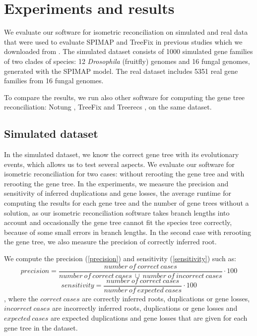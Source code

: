 \chapter{Experiments and results}

We evaluate our software for isometric reconciliation on simulated and real data that were used to evaluate SPIMAP \cite{spimap} and TreeFix \cite{treefix} in previous studies which we downloaded from \cite{treefix_online}. The simulated dataset consists of 1000 simulated gene families of two clades of species: 12 \emph{Drosophila} (fruitfly) genomes and 16 fungal genomes, generated with the SPIMAP model. The real dataset includes 5351 real gene families from 16 fungal genomes.

To compare the results, we run also other software for computing the gene tree reconciliation: Notung \cite{notung}, TreeFix \cite{treefix} and Treerecs \cite{treerecs}, on the same dataset.

\section{Simulated dataset}

In the simulated dataset, we know the correct gene tree with its evolutionary events, which allows us to test several aspects. We evaluate our software for isometric reconciliation for two cases: without rerooting the gene tree and with rerooting the gene tree. In the experiments, we measure the precision and sensitivity of inferred duplications and gene losses, the average runtime for computing the results for each gene tree and the number of gene trees without a solution, as our isometric reconciliation software takes branch lengths into account and occasionally the gene tree cannot fit the species tree correctly, because of some small errors in branch lengths. In the second case with rerooting the gene tree, we also measure the precision of correctly inferred root.

We compute the precision (\ref{precision}) and sensitivity (\ref{sensitivity}) such as:
\begin{equation}
\label{precision}
    precision = \frac{number\ of\ correct\ cases}{number\ of\ correct\ cases\ \cup\ number\ of\ incorrect\ cases} \cdot 100
\end{equation}
\begin{equation}
\label{sensitivity}
    sensitivity = \frac{number\ of\ correct\ cases}{number\ of\ expected\ cases} \cdot 100
\end{equation}
, where the $correct\ cases$ are correctly inferred roots, duplications or gene losses, $incorrect\ cases$ are incorrectly inferred roots, duplications or gene losses and $expected\ cases$ are expected duplications and gene losses that are given for each gene tree in the dataset.

